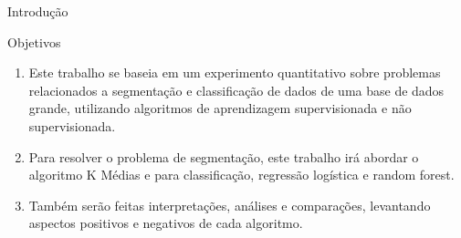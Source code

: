 \documentclass[final,hyperref={pdfpagelabels=false}]{beamer}
\begin{document}
\begin{frame}[t]
\begin{columns}[t]
\begin{column}{.465\textwidth}
\begin{block}{Introdu\c c\~ao}
\end{block}



\begin{block}{Objetivos}

\begin{enumerate}
\item Este trabalho se baseia em um experimento quantitativo sobre problemas relacionados a segmentação e classificação de dados de uma base de dados grande, utilizando algoritmos de aprendizagem supervisionada e não supervisionada.
\item Para resolver o problema de segmentação, este trabalho irá abordar o algoritmo K Médias e para classificação, regressão logística e random forest.
\item Também serão feitas interpretações, análises e comparações, levantando aspectos positivos e negativos de cada algoritmo.
\end{enumerate}

\end{block}






\end{column}
\end{columns}
\end{frame}
\end{document}
